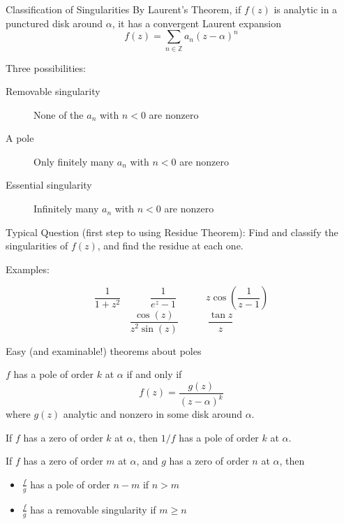 \documentclass{beamer}
\newcommand{\Z}{\mathbb{Z}}
\begin{document}
\begin{frame}{Classification of Singularities}
By Laurent's Theorem, if $f(z)$ is analytic in a punctured disk around $\alpha$, it has a convergent Laurent expansion
$$f(z)=\sum_{n\in\Z} a_n (z-\alpha)^n$$
\begin{block}{Three possibilities:}
\begin{description}
   \item[Removable singularity] None of the $a_n$ with $n<0$ are nonzero
       \item[A pole] Only finitely many $a_n$ with $n<0$ are nonzero
    \item[Essential singularity] Infinitely many $a_n$ with $n<0$ are nonzero

\end{description}
\end{block}

\begin{block}{Typical Question (first step to using Residue Theorem):}
Find and classify the singularities of $f(z)$, and find the residue at each one.
\end{block}

\end{frame}


\begin{frame}{Examples:}

  
   $$\frac{1}{1+z^2} \quad\quad\quad \frac{1}{e^z-1}\quad\quad\quad z\cos\left(\frac{1}{z-1}\right)$$
    $$\frac{\cos(z)}{z^2\sin(z)} \quad\quad\quad \frac{\tan{z}}{z}$$  

      
  


\end{frame}  

\begin{frame}{Easy (and examinable!) theorems about poles}
\begin{theorem} $f$ has a pole of order $k$ at $\alpha$ if and only if $$f(z)=\frac{g(z)}{(z-\alpha)^k}$$ where $g(z)$ analytic and nonzero in some disk around $\alpha$.
\end{theorem}

\begin{theorem} If $f$ has a zero of order $k$ at $\alpha$, then $1/f$ has a pole of order $k$ at $\alpha$.
\end{theorem}

\begin{corollary}If $f$ has a zero of order $m$ at $\alpha$, and $g$ has a zero of order $n$ at $\alpha$, then
\begin{itemize}
    \item $\frac{f}{g}$ has a pole of order $n-m$ if $n>m$
    \item $\frac{f}{g}$ has a removable singularity if $m\geq n$
\end{itemize}
\end{corollary}
\end{frame}
\end{document}
